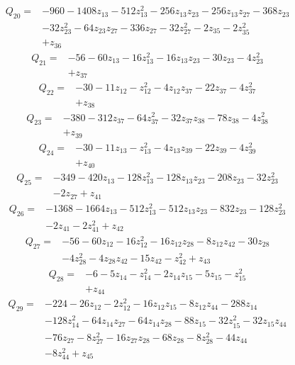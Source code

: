 \[\begin{aligned}Q_{20}={}&-960-1408z_{13}-512z_{13}^{2}-256z_{13}z_{23}-256z_{13}z_{27}-368z_{23}
\\&-32z_{23}^{2}-64z_{23}z_{27}-336z_{27}-32z_{27}^{2}-2z_{35}-2z_{35}^{2}
\\&+z_{36}
\end{aligned}\]
\[\begin{aligned}Q_{21}={}&-56-60z_{13}-16z_{13}^{2}-16z_{13}z_{23}-30z_{23}-4z_{23}^{2}
\\&+z_{37}
\end{aligned}\]
\[\begin{aligned}Q_{22}={}&-30-11z_{12}-z_{12}^{2}-4z_{12}z_{37}-22z_{37}-4z_{37}^{2}
\\&+z_{38}
\end{aligned}\]
\[\begin{aligned}Q_{23}={}&-380-312z_{37}-64z_{37}^{2}-32z_{37}z_{38}-78z_{38}-4z_{38}^{2}
\\&+z_{39}
\end{aligned}\]
\[\begin{aligned}Q_{24}={}&-30-11z_{13}-z_{13}^{2}-4z_{13}z_{39}-22z_{39}-4z_{39}^{2}
\\&+z_{40}
\end{aligned}\]
\[\begin{aligned}Q_{25}={}&-349-420z_{13}-128z_{13}^{2}-128z_{13}z_{23}-208z_{23}-32z_{23}^{2}
\\&-2z_{27}+z_{41}
\end{aligned}\]
\[\begin{aligned}Q_{26}={}&-1368-1664z_{13}-512z_{13}^{2}-512z_{13}z_{23}-832z_{23}-128z_{23}^{2}
\\&-2z_{41}-2z_{41}^{2}+z_{42}
\end{aligned}\]
\[\begin{aligned}Q_{27}={}&-56-60z_{12}-16z_{12}^{2}-16z_{12}z_{28}-8z_{12}z_{42}-30z_{28}
\\&-4z_{28}^{2}-4z_{28}z_{42}-15z_{42}-z_{42}^{2}+z_{43}
\end{aligned}\]
\[\begin{aligned}Q_{28}={}&-6-5z_{14}-z_{14}^{2}-2z_{14}z_{15}-5z_{15}-z_{15}^{2}
\\&+z_{44}
\end{aligned}\]
\[\begin{aligned}Q_{29}={}&-224-26z_{12}-2z_{12}^{2}-16z_{12}z_{15}-8z_{12}z_{44}-288z_{14}
\\&-128z_{14}^{2}-64z_{14}z_{27}-64z_{14}z_{28}-88z_{15}-32z_{15}^{2}-32z_{15}z_{44}
\\&-76z_{27}-8z_{27}^{2}-16z_{27}z_{28}-68z_{28}-8z_{28}^{2}-44z_{44}
\\&-8z_{44}^{2}+z_{45}
\end{aligned}\]
